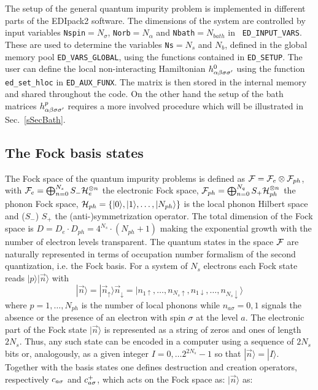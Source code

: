 \documentclass[preprint,3p,10pt]{elsarticle}
\newcommand{\secu}[1]
{Sec.~\ref{#1}}
\newcommand{\ket}[1]
{|#1\rangle}
\def\a{\alpha}       \def\b{\beta}   \def\g{\gamma}   \def\d{\delta}
\def\up{\uparrow} \def\down{\downarrow} \def\dw{\downarrow}
\def\NAME{{\rm EDIpack2 }}
\begin{document}
The setup of the general quantum impurity problem is implemented in
different parts of the \NAME software. The dimensions of the system
are controlled by input variables {\tt Nspin}$=N_\sigma$,
{\tt Norb}$=N_\a$ and {\tt Nbath}$=N_{bath}$ in {\tt
  ED\_INPUT\_VARS}. These are used to
determine the variables {\tt Ns}$=N_s$ and $N_b$, defined in the global
memory pool {\tt ED\_VARS\_GLOBAL}, using the functions contained
in {\tt ED\_SETUP}. 
The user can define the local non-interacting Hamiltonian
$h^0_{\a\b\s\s'}$ using the function {\tt ed\_set\_hloc} in {\tt ED\_AUX\_FUNX}.
The matrix is then stored in the internal memory and shared throughout the
code.
On the other hand the setup of the bath matrices $h^p_{\a\b\s\s'}$
requires a more involved procedure which will be illustrated in
\secu{sSecBath}. 


\subsection{The Fock basis states}\label{sSecBasis}
The Fock space of the quantum impurity problems is defined as
${\cal F}={\cal F}_e\otimes {\cal F}_{ph}$, with ${\cal F}_e=\bigoplus_{n=0}^{N_s}
S_-{\cal H}_e^{\otimes n}$ the electronic Fock space,  ${\cal F}_{ph}=\bigoplus_{n=0}^{N_q}S_+{\cal H}_{ph}^{\otimes n}$ the
phonon Fock space,  $\HH_{ph}=\{\ket{0},\ket{1},\dots,\ket{N_{ph}}\}$ is the local phonon Hilbert space
and ($S_-$)  $S_+$ the (anti-)symmetrization operator.  
The total dimension of the Fock space is
$D=D_e\cdot D_{ph}=4^{N_s}\cdot (N_{ph}+1)$ making the exponential
growth with the number of electron levels transparent. 
The quantum states in the space ${\cal F}$ are naturally represented in
terms of occupation number formalism of the second quantization,
i.e. the Fock basis.
For a system of $N_s$ electrons each Fock state
reads $\ket{p}\ket{\vec{n}}$ with
$$
\ket{\vec{n}}=\ket{\vec{n}_\up}{\vec{n}_\dw}=\ket{n_{1\up},\dots,n_{N_s\up},n_{1\dw},\dots,n_{N_s\dw}}
$$ 
where $p=1,\dots,N_{ph}$ is the number of local phonons while $n_{a\sigma}=0,1$ signals the absence or the
presence of an electron with spin $\sigma$ at the level $a$.
The electronic part of the Fock state $\ket{\vec{n}}$ is represented as a string of
zeros and ones of length $2N_s$. Thus, any such state can  be encoded
in a computer using a sequence of $2N_s$ bits or, analogously, as a
given integer $I=0,\dots 2^{2N_s}-1$ so that $\ket{\vec{n}}=\ket{I}$.  
Together with the basis states one defines  destruction and creation 
operators, respectively $c_{a\sigma}$ and $c^+_{a\sigma}$, which acts on the
Fock space as: 
$\ket{\vec{n}}$ as:  
\end{document}

